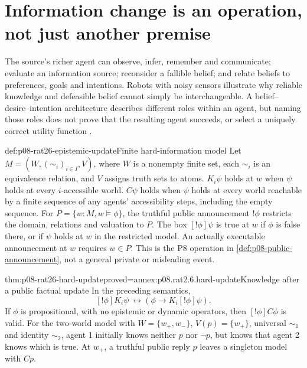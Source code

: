 \section{Information change is an operation, not just another premise}

The source's richer agent can observe, infer, remember and communicate;
evaluate an information source; reconsider a fallible belief; and relate
beliefs to preferences, goals and intentions. Robots with noisy sensors
illustrate why reliable knowledge and defeasible belief cannot simply
be interchangeable. A belief--desire--intention architecture describes
different roles within an agent, but naming those roles does not prove
that the resulting agent succeeds, or select a uniquely correct utility
function \cite[pp.~188--190]{VanBenthemLiuSmets2021Logico}.

\begin{hbdefinition}{def:p08-rat26-epistemic-update}{Finite hard-information model}
Let \(M=(W,(\sim_i)_{i\in I},V)\), where \(W\) is a nonempty
finite set, each \(\sim_i\) is an equivalence relation, and \(V\)
assigns truth sets to atoms. \(K_i\psi\) holds at \(w\) when
\(\psi\) holds at every \(i\)-accessible world. \(C\psi\) holds
when \(\psi\) holds at every world reachable by a finite sequence
of any agents' accessibility steps, including the empty sequence.
For \(P=\{w:M,w\models\phi\}\), the truthful public announcement
\(!\phi\) restricts the domain, relations and valuation to \(P\).
The box \([!\phi]\psi\) is true at \(w\) if \(\phi\) is false
there, or if \(\psi\) holds at \(w\) in the restricted model.
An actually executable announcement at \(w\) requires \(w\in P\).
This is the P8 operation in \cref{def:p08-public-announcement}, not
a general private or misleading event.
\end{hbdefinition}

\begin{hbtheorem}{thm:p08-rat26-hard-update}{proved=annex:p08.rat2.6.hard-update}{Knowledge after a public factual update}
In the preceding semantics,
\[
 [!\phi]K_i\psi\ \leftrightarrow
 (\phi\to K_i[!\phi]\psi).
\]
If \(\phi\) is propositional, with no epistemic or dynamic operators,
then \([!\phi]C\phi\) is valid. For the two-world model with
\(W=\{w_+,w_-\}\), \(V(p)=\{w_+\}\), universal \(\sim_1\)
and identity \(\sim_2\), agent 1 initially knows neither \(p\) nor
\(\neg p\), but knows that agent 2 knows which is true. At \(w_+\),
a truthful public reply \(p\) leaves a singleton model with \(Cp\).
\end{hbtheorem}

